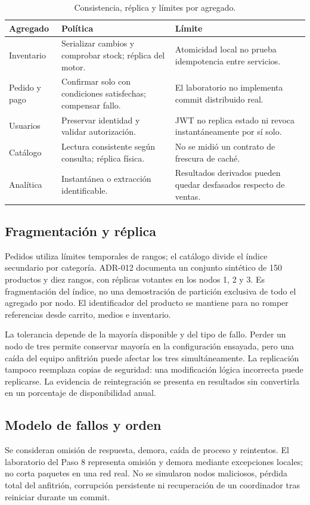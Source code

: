 \documentclass[12pt,a4paper]{article}
\begin{document}
\begin{table}[H]\centering\small
\caption{Consistencia, réplica y límites por agregado.}\label{tab:cap}
\begin{tabularx}{\textwidth}{lXX}
\toprule Agregado & Política & Límite\\\midrule
Inventario & Serializar cambios y comprobar stock; réplica del motor. & Atomicidad local no prueba idempotencia entre servicios.\\
Pedido y pago & Confirmar solo con condiciones satisfechas; compensar fallo. & El laboratorio no implementa commit distribuido real.\\
Usuarios & Preservar identidad y validar autorización. & JWT no replica estado ni revoca instantáneamente por sí solo.\\
Catálogo & Lectura consistente según consulta; réplica física. & No se midió un contrato de frescura de caché.\\
Analítica & Instantánea o extracción identificable. & Resultados derivados pueden quedar desfasados respecto de ventas.\\\bottomrule
\end{tabularx}
\end{table}

\subsection{Fragmentación y réplica}
Pedidos utiliza límites temporales de rangos; el catálogo divide el índice secundario por categoría. ADR-012 documenta un conjunto sintético de 150 productos y diez rangos, con réplicas votantes en los nodos 1, 2 y 3. Es fragmentación del índice, no una demostración de partición exclusiva de todo el agregado por nodo. El identificador del producto se mantiene para no romper referencias desde carrito, medios e inventario.

La tolerancia depende de la mayoría disponible y del tipo de fallo. Perder un nodo de tres permite conservar mayoría en la configuración ensayada, pero una caída del equipo anfitrión puede afectar los tres simultáneamente. La replicación tampoco reemplaza copias de seguridad: una modificación lógica incorrecta puede replicarse. La evidencia de reintegración se presenta en resultados sin convertirla en un porcentaje de disponibilidad anual.

\subsection{Modelo de fallos y orden}
Se consideran omisión de respuesta, demora, caída de proceso y reintentos. El laboratorio del Paso 8 representa omisión y demora mediante excepciones locales; no corta paquetes en una red real. No se simularon nodos maliciosos, pérdida total del anfitrión, corrupción persistente ni recuperación de un coordinador tras reiniciar durante un commit.
\end{document}
